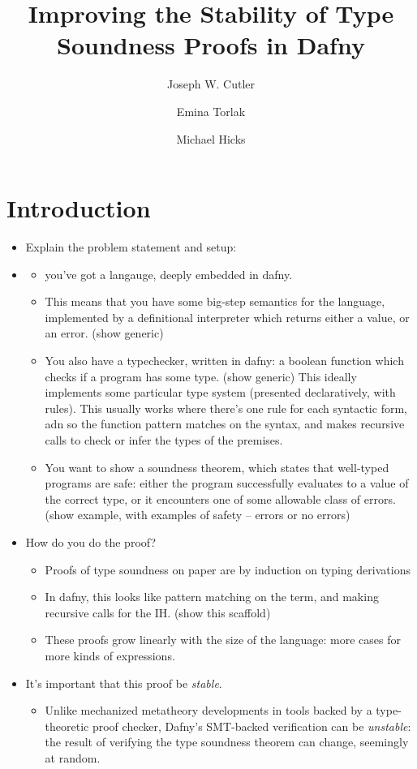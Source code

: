 \documentclass[sigplan,review,screen,anonymous]{acmart}
\author{Joseph W. Cutler}
\affiliation{%
  \institution{University of Pennsylvania}
  \city{Philadelphia}
  \state{Pennsylvania}
  \country{USA}
}
\author{Emina Torlak}
\affiliation{%
  \institution{Amazon Web Services}
  \city{Seattle}
  \state{Washington}
  \country{USA}
}
\author{Michael Hicks}
\affiliation{%
  \institution{Amazon Web Services}
  \city{Arlington}
  \state{Virginia}
  \country{USA}
}
\title{Improving the Stability of Type Soundness Proofs in Dafny}
\begin{document}
\maketitle

\section{Introduction}

\begin{itemize}
    \item Explain the problem statement and setup:
    \item \begin{itemize}
      \item you've got a langauge, deeply embedded in dafny.
      \item This means that you have some big-step semantics for the language, implemented by a definitional interpreter which returns either a value, or an error. (show generic)
      \item You also have a typechecker, written in dafny: a boolean function which checks if a program has some type.  (show generic)
            This ideally implements some particular type system (presented declaratively, with rules). This usually works where there's one rule for each syntactic form, adn so the function pattern matches on the syntax, and makes recursive calls to check or infer the types of the premises.
      \item You want to show a soundness theorem, which states that well-typed programs are safe: either the program successfully evaluates to a value of the correct type, or it encounters one of some allowable class of errors. (show example, with examples of safety -- errors or no errors)
    \end{itemize}

    \item How do you do the proof?
    \begin{itemize}
      \item Proofs of type soundness on paper are by induction on typing derivations
      \item In dafny, this looks like pattern matching on the term, and making recursive calls for the IH. (show this scaffold)
      \item These proofs grow linearly with the size of the language: more cases for more kinds of expressions.
    \end{itemize}

    \item It's important that this proof be \emph{stable}. 
    \begin{itemize}
      \item Unlike mechanized metatheory developments in tools backed by a type-theoretic proof checker, Dafny's SMT-backed verification
      can be \emph{unstable}: the result of verifying the type soundness theorem
      can change, seemingly at random.


\end{itemize}
\end{itemize}
\end{document}
